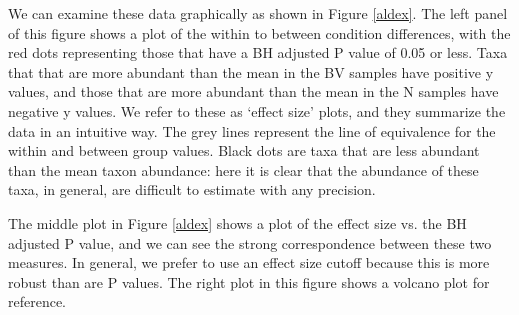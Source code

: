 \documentclass[11pt]{article}\usepackage[]{graphicx}\usepackage[]{color}
\begin{document}
We can examine these data graphically as shown in Figure \ref{aldex}. The left panel of this figure shows a plot of the within to between condition differences, with the red dots representing those that have a BH adjusted P value of 0.05 or less. Taxa that that are more abundant than the mean in the BV samples have positive y values, and those that are more abundant than the mean in the N samples have negative y values. We refer to these as `effect size' plots, and they summarize the data in an intuitive way. The grey lines represent the line of equivalence for the within and between group values. Black dots are taxa that are less abundant than the mean taxon abundance: here it is clear that the abundance of these taxa, in general, are difficult to estimate with any precision.

The middle plot in Figure \ref{aldex} shows a plot of the effect size vs. the BH adjusted P value, and we can see the strong correspondence between these two measures. In general, we prefer to use an effect size cutoff because this is more robust than are P values. The right plot in this figure shows a volcano plot for reference.
\end{document}
